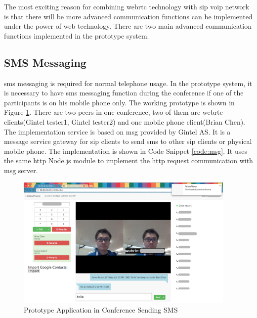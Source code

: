 \noindent The most exciting reason for combining \gls{webrtc} technology with \gls{sip} \gls{voip} network is that there will be more advanced communication functions can be implemented under the power of web technology. There are two main advanced communication functions implemented in the prototype system.

\subsection{SMS Messaging}

\par \gls{sms} messaging is required for normal telephone usage. In the prototype system, it is necessary to have \gls{sms} messaging function during the conference if one of the participants is on his mobile phone only. The working prototype is shown in Figure \ref{fig:webgui_join_conference}. There are two peers in one conference, two of them are \gls{webrtc} clients(Gintel tester1, Gintel tester2) and one mobile phone client(Brian Chen). The implementation service is based on \gls{msg} provided by Gintel AS. It is a message service gateway for \gls{sip} clients to send \gls{sms} to other \gls{sip} clients or physical mobile phone. The implementation is shown in Code Snippet \ref{code:msg}. It uses the same \gls{http} Node.js module to implement the \gls{http} request communication with \gls{msg} server.

\begin{figure}
	\centering
    	\includegraphics[width=0.95\textwidth,natwidth=610,natheight=642]{figs/webgui_join_conference.png}
  	\caption{Prototype Application in Conference Sending SMS}
  	\label{fig:webgui_join_conference}
\end{figure}

